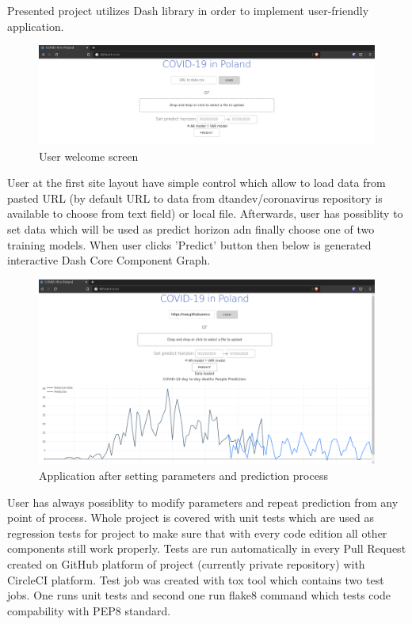 \documentclass[conference]{IEEEtran}
\begin{document}
Presented project utilizes Dash library in order to implement user-friendly application.
\begin{figure}[h!]
    \includegraphics[width=\linewidth]{images/gui1.png}
    \caption{User welcome screen}
    \label{fig:gui1}
\end{figure}
\newline
User at the first site layout have simple control which allow to load data from pasted URL (by default URL to data from dtandev/coronavirus repository is available to choose from text field) or local file.
Afterwards, user has possiblity to set data which will be used as predict horizon adn finally choose one of two training models.
\newline
When user clicks 'Predict' button then below is generated interactive Dash Core Component Graph.
\begin{figure}[h!]
    \includegraphics[width=\linewidth]{images/gui2.png}
    \caption{Application after setting parameters and prediction process}
    \label{fig:gui2}
\end{figure}
\newline
User has always possiblity to modify parameters and repeat prediction from any point of process.
\newline
\newline
Whole project is covered with unit tests which are used as regression tests for project to make sure that with every code edition all other components still work properly.
\newline
Tests are run automatically in every Pull Request created on GitHub platform of project (currently private repository) with CircleCI platform.
\newline
Test job was created with tox tool which contains two test jobs.
\newline
One runs unit tests and second one run flake8 command which tests code compability with PEP8 standard.
\end{document}
